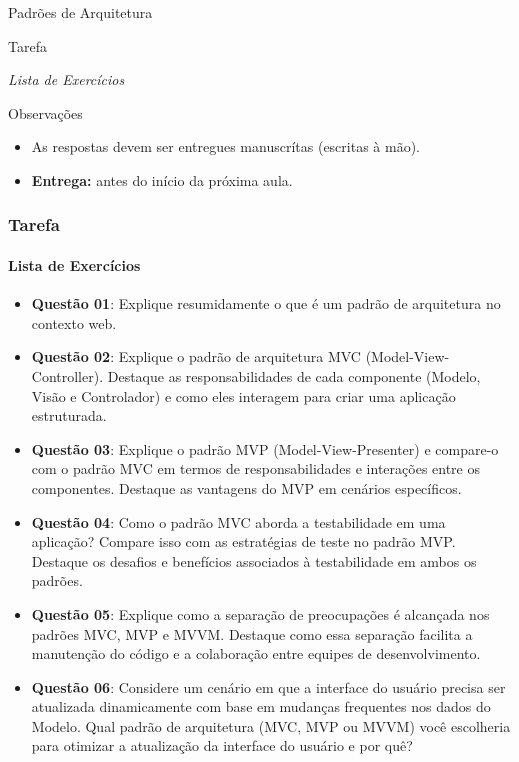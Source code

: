 \documentclass[
	10pt, %
	t, %
]{beamer}
\begin{document}
\begin{frame}
	\begin{center}
		
		\bigskip\bigskip\bigskip\bigskip %
		{\Large Padrões de Arquitetura}
		
		\bigskip\bigskip %
		{\Huge Tarefa}
		
		\smallskip
		{\small \textit{Lista de Exercícios}}

		\bigskip\bigskip
		\begin{block}{Observações}
			\begin{itemize}
				\item As respostas devem ser entregues manuscrítas (escritas à mão).
				\item \textbf{Entrega:} antes do início da próxima aula.
			\end{itemize}
		\end{block}
	\end{center}

\end{frame}

\begin{frame}
	\frametitle{Tarefa}
	\framesubtitle{Lista de Exercícios}
	
	\begin{itemize}
		\item { \small \textbf{Questão 01}: Explique resumidamente o que é um padrão de arquitetura no contexto web. }
		\item { \small \textbf{Questão 02}: Explique o padrão de arquitetura MVC (Model-View-Controller). Destaque as responsabilidades de cada componente (Modelo, Visão e Controlador) e como eles interagem para criar uma aplicação estruturada. }
		\item { \small \textbf{Questão 03}: Explique o padrão MVP (Model-View-Presenter) e compare-o com o padrão MVC em termos de responsabilidades e interações entre os componentes. Destaque as vantagens do MVP em cenários específicos. }
		\item { \small \textbf{Questão 04}: Como o padrão MVC aborda a testabilidade em uma aplicação? Compare isso com as estratégias de teste no padrão MVP. Destaque os desafios e benefícios associados à testabilidade em ambos os padrões. }
		\item { \small \textbf{Questão 05}: Explique como a separação de preocupações é alcançada nos padrões MVC, MVP e MVVM. Destaque como essa separação facilita a manutenção do código e a colaboração entre equipes de desenvolvimento. }
		\item { \small \textbf{Questão 06}: Considere um cenário em que a interface do usuário precisa ser atualizada dinamicamente com base em mudanças frequentes nos dados do Modelo. Qual padrão de arquitetura (MVC, MVP ou MVVM) você escolheria para otimizar a atualização da interface do usuário e por quê? }
	\end{itemize}
	
\end{frame}
\end{document}
